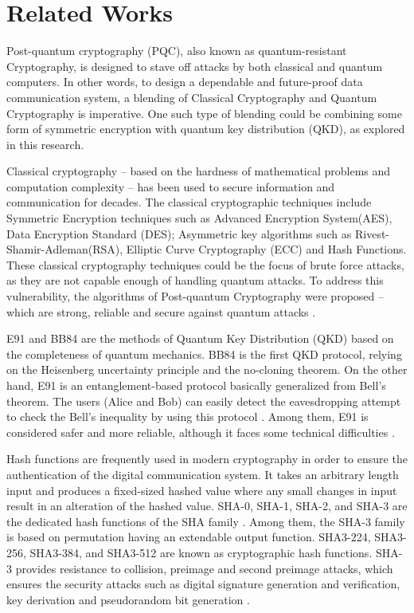 \documentclass[a4paper]{cas-sc}
\begin{document}
\section{Related Works}
\label{sec:relatedWorks}
Post-quantum cryptography (PQC), also known as quantum-resistant Cryptography, is designed to stave off attacks
by both classical and quantum computers. In other words, to design a dependable and future-proof data communication
system, a blending of Classical Cryptography and Quantum Cryptography is imperative. One such type of blending
could be combining some form of symmetric encryption with quantum key distribution (QKD), as explored in this research.

Classical cryptography -- based on the hardness of mathematical problems and computation complexity -- has been used to secure information and communication for decades. The classical cryptographic techniques include Symmetric Encryption techniques such as Advanced Encryption System(AES), Data Encryption Standard (DES); Asymmetric key algorithms such as Rivest-Shamir-Adleman(RSA), Elliptic Curve Cryptography (ECC) and Hash Functions. These classical cryptography techniques could be the focus of brute force attacks, as they are not capable enough of handling quantum attacks. To address this vulnerability, the algorithms of Post-quantum Cryptography were proposed -- which are strong, reliable and secure against quantum attacks \cite{sharma2023post}.

E91 and BB84 are the methods of Quantum Key Distribution (QKD) based on the completeness of quantum mechanics. BB84 is the first QKD protocol, relying on the Heisenberg uncertainty principle and the no-cloning theorem. On the other hand, E91 is an entanglement-based protocol basically generalized from Bell's theorem. The users (Alice and Bob) can easily detect the eavesdropping attempt to check the Bell's inequality by using this protocol \cite{Ekert1991}. Among them, E91 is considered safer and more reliable, although it faces some technical difficulties \cite{alvarez2016comparison}.

Hash functions are frequently used in modern cryptography in order to ensure the authentication of the digital communication system. It takes an arbitrary length input and produces a fixed-sized hashed value where any small changes in input result in an alteration of the hashed value. SHA-0, SHA-1, SHA-2, and SHA-3 are the dedicated hash functions of the SHA family \cite{madhuravani2013cryptographic}. Among them, the SHA-3 family is based on permutation having an extendable output function. SHA3-224, SHA3-256, SHA3-384, and SHA3-512 are known as cryptographic hash functions. SHA-3 provides resistance to collision, preimage and second preimage attacks, which ensures the security attacks such as digital signature generation and verification, key derivation and pseudorandom bit generation  \cite{dworkin2015sha}.
\end{document}
